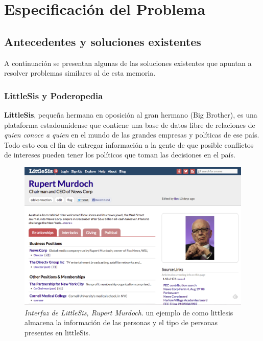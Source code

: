 \chapter{Especificación del Problema}
\label{chap:especificacion_problema}

\section{Antecedentes y soluciones existentes} %
\label{sec:antecedentes_y_soluciones_existentes}

A continuación se presentan algunas de las soluciones existentes que apuntan a resolver problemas similares al de esta memoria.

\subsection{LittleSis y Poderopedia} %
\label{sub:littlesis_y_poderopedia}

\textbf{LittleSis}, pequeña hermana en oposición al gran hermano (Big Brother), es una plataforma estadounidense que contiene una base de datos libre de relaciones de \emph{quien conoce a quien} en el mundo de las grandes empresas y políticas de ese país. Todo esto con el fin de entregar información a la gente de que posible conflictos de intereses pueden tener los políticos que toman las decisiones en el país.

\begin{figure}[H]
  \includegraphics[width=1.0\textwidth]{images/littlesis.png}
  \caption[Interfaz de LittleSis, Rupert Murdoch]{\emph{Interfaz de LittleSis, Rupert Murdoch}. un ejemplo de como littlesis almacena la información de las personas y el tipo de personas presentes en littleSis.}
  \label{ejemplo_littlesis}
\end{figure}

